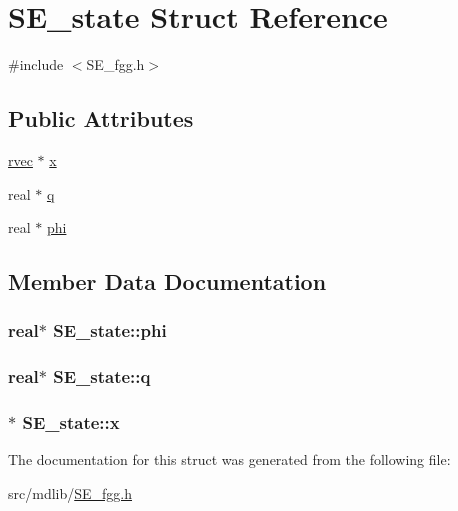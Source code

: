 \hypertarget{structSE__state}{\section{\-S\-E\-\_\-state \-Struct \-Reference}
\label{structSE__state}
}


{\ttfamily \#include $<$\-S\-E\-\_\-fgg.\-h$>$}

\subsection*{\-Public \-Attributes}
\begin{DoxyCompactItemize}
\item 
\hyperlink{share_2template_2gromacs_2types_2simple_8h_aa02a552a4abd2f180c282a083dc3a999}{rvec} $\ast$ \hyperlink{structSE__state_a70bc4178f3c100774288471fcd175622}{x}
\item 
real $\ast$ \hyperlink{structSE__state_a650872aab621cdbb4c75496634867c01}{q}
\item 
real $\ast$ \hyperlink{structSE__state_a74cd1912842808aa0df4443f2888827e}{phi}
\end{DoxyCompactItemize}


\subsection{\-Member \-Data \-Documentation}
\hypertarget{structSE__state_a74cd1912842808aa0df4443f2888827e}{
\subsubsection[{phi}]{\setlength{\rightskip}{0pt plus 5cm}real$\ast$ {\bf \-S\-E\-\_\-state\-::phi}}}\label{structSE__state_a74cd1912842808aa0df4443f2888827e}
\hypertarget{structSE__state_a650872aab621cdbb4c75496634867c01}{
\subsubsection[{q}]{\setlength{\rightskip}{0pt plus 5cm}real$\ast$ {\bf \-S\-E\-\_\-state\-::q}}}\label{structSE__state_a650872aab621cdbb4c75496634867c01}
\hypertarget{structSE__state_a70bc4178f3c100774288471fcd175622}{
\subsubsection[{x}]{$\ast$ {\bf \-S\-E\-\_\-state\-::x}}}\label{structSE__state_a70bc4178f3c100774288471fcd175622}


\-The documentation for this struct was generated from the following file\-:\begin{DoxyCompactItemize}
\item 
src/mdlib/\hyperlink{SE__fgg_8h}{\-S\-E\-\_\-fgg.\-h}\end{DoxyCompactItemize}

